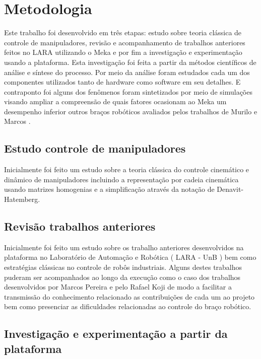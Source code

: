 \section{Metodologia}

Este trabalho foi desenvolvido em três etapas: estudo sobre teoria clássica de controle de manipuladores, revisão e acompanhamento de trabalhos anteriores feitos no LARA utilizando o Meka e por fim a investigação e experimentação usando a plataforma. Esta investigação foi feita a partir da métodos científicos de análise e síntese do processo. Por meio da análise foram estudados cada um dos componentes utilizados tanto de hardware como software em seu detalhes. E contraponto foi alguns dos fenômenos foram sintetizados por meio de simulações visando ampliar a compreensão de quais fatores ocasionam ao Meka um desempenho inferior outros braços robóticos avaliados pelos trabalhos de Murilo \cite{murlow2014} e Marcos \cite{marcosps2016}.

\subsection{Estudo controle de manipuladores}

Inicialmente foi feito um estudo sobre a teoria clássica do controle cinemático e dinâmico de manipuladores incluindo a representação por cadeia cinemática usando matrizes homogenias e a simplificação através da notação de Denavit-Hatemberg.

\subsection{Revisão trabalhos anteriores}

Inicialmente foi feito um estudo sobre os trabalho anteriores desenvolvidos na plataforma no Laboratório de Automação e Robótica ( LARA - UnB ) bem como estratégias clássicas no controle de robôs industriais. Alguns destes trabalhos puderam ser acompanhados ao longo da execução como o caso dos trabalhos desenvolvidos por Marcos Pereira e pelo Rafael Koji de modo a facilitar a transmissão do conhecimento relacionado as contribuições de cada um ao projeto bem como presenciar as dificuldades relacionadas ao controle do braço robótico.

\subsection{Investigação e experimentação a partir da plataforma}

